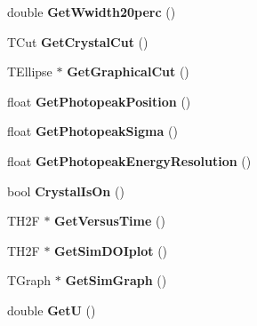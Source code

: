 \begin{DoxyCompactItemize}
\item 
\hypertarget{classCrystal_a2421f68bf5e18225b32233736bf0e941}{double {\bfseries Get\+Wwidth20perc} ()}\label{classCrystal_a2421f68bf5e18225b32233736bf0e941}

\item 
\hypertarget{classCrystal_a321e8e8aee60ca58a2d7e7ff6f923bdd}{T\+Cut {\bfseries Get\+Crystal\+Cut} ()}\label{classCrystal_a321e8e8aee60ca58a2d7e7ff6f923bdd}

\item 
\hypertarget{classCrystal_a2115d38df8c47c85b7e10ecc35c47b2f}{T\+Ellipse $\ast$ {\bfseries Get\+Graphical\+Cut} ()}\label{classCrystal_a2115d38df8c47c85b7e10ecc35c47b2f}

\item 
\hypertarget{classCrystal_a522e1a3d66cdc40c0d9997b5d1e12541}{float {\bfseries Get\+Photopeak\+Position} ()}\label{classCrystal_a522e1a3d66cdc40c0d9997b5d1e12541}

\item 
\hypertarget{classCrystal_ad569aa2fffeb3e6c2372e8911034e62b}{float {\bfseries Get\+Photopeak\+Sigma} ()}\label{classCrystal_ad569aa2fffeb3e6c2372e8911034e62b}

\item 
\hypertarget{classCrystal_a524f528dd614f83f34a9fb812ea8d736}{float {\bfseries Get\+Photopeak\+Energy\+Resolution} ()}\label{classCrystal_a524f528dd614f83f34a9fb812ea8d736}

\item 
\hypertarget{classCrystal_a35c22232aa809cff0880014868fca953}{bool {\bfseries Crystal\+Is\+On} ()}\label{classCrystal_a35c22232aa809cff0880014868fca953}

\item 
\hypertarget{classCrystal_a9c53022d870dbee0eae995fd96d4d091}{T\+H2\+F $\ast$ {\bfseries Get\+Versus\+Time} ()}\label{classCrystal_a9c53022d870dbee0eae995fd96d4d091}

\item 
\hypertarget{classCrystal_a9134db27f849c3aaedc8e23168dd3d6d}{T\+H2\+F $\ast$ {\bfseries Get\+Sim\+D\+O\+Iplot} ()}\label{classCrystal_a9134db27f849c3aaedc8e23168dd3d6d}

\item 
\hypertarget{classCrystal_a3b46dc782bf50572aac24838d800db5e}{T\+Graph $\ast$ {\bfseries Get\+Sim\+Graph} ()}\label{classCrystal_a3b46dc782bf50572aac24838d800db5e}

\item 
\hypertarget{classCrystal_a48ff2699084705a04f1150c11ab7b401}{double {\bfseries Get\+U} ()}\label{classCrystal_a48ff2699084705a04f1150c11ab7b401}


\end{DoxyCompactItemize}
